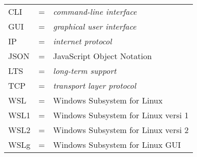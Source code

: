\begin{tabular}{llp{3in}}
    CLI & \hspace{1.5cm} = & \textit{command-line interface}\\
    GUI & \hspace{1.5cm} = & \textit{graphical user interface}\\
    IP & \hspace{1.5cm} = & \textit{internet protocol}\\
    JSON & \hspace{1.5cm} = & JavaScript Object Notation\\
    LTS & \hspace{1.5cm} = & \textit{long-term support}\\
    TCP & \hspace{1.5cm} = & \textit{transport layer protocol}\\
    WSL & \hspace{1.5cm} = & Windows Subsystem for Linux\\
    WSL1 & \hspace{1.5cm} = & Windows Subsystem for Linux versi 1\\
    WSL2 & \hspace{1.5cm} = & Windows Subsystem for Linux versi 2\\
    WSLg & \hspace{1.5cm} = & Windows Subsystem for Linux GUI
\end{tabular}
